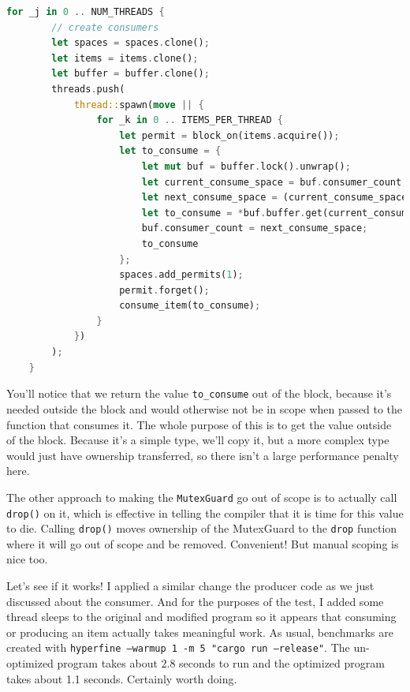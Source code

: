 \documentclass[a4paper]{report}
\begin{document}
\begin{lstlisting}[language=Rust]
    for _j in 0 .. NUM_THREADS {
        // create consumers
        let spaces = spaces.clone();
        let items = items.clone();
        let buffer = buffer.clone();
        threads.push(
            thread::spawn(move || {
                for _k in 0 .. ITEMS_PER_THREAD {
                    let permit = block_on(items.acquire());
                    let to_consume = {
                        let mut buf = buffer.lock().unwrap();
                        let current_consume_space = buf.consumer_count;
                        let next_consume_space = (current_consume_space + 1) % buf.buffer.len();
                        let to_consume = *buf.buffer.get(current_consume_space).unwrap();
                        buf.consumer_count = next_consume_space;
                        to_consume
                    };
                    spaces.add_permits(1);
                    permit.forget();
                    consume_item(to_consume);
                }
            })
        );
    }
\end{lstlisting}

You'll notice that we return the value \texttt{to\_consume} out of the block, because it's needed outside the block and would otherwise not be in scope when passed to the function that consumes it. The whole purpose of this is to get the value outside of the block. Because it's a simple type, we'll copy it, but a more complex type would just have ownership transferred, so there isn't a large performance penalty here.

The other approach to making the \texttt{MutexGuard} go out of scope is to actually call \texttt{drop()} on it, which is effective in telling the compiler that it is time for this value to die. Calling \texttt{drop()} moves ownership of the MutexGuard to the \texttt{drop} function where it will go out of scope and be removed. Convenient! But manual scoping is nice too.

Let's see if it works! I applied a similar change the producer code as we just discussed about the consumer. And for the purposes of the test, I added some thread sleeps to the original and modified program so it appears that consuming or producing an item actually takes meaningful work. As usual, benchmarks are created with \texttt{hyperfine --warmup 1 -m 5 "cargo run --release"}. The un-optimized program takes about 2.8 seconds to run and the optimized program takes about 1.1 seconds. Certainly worth doing.
\end{document}
